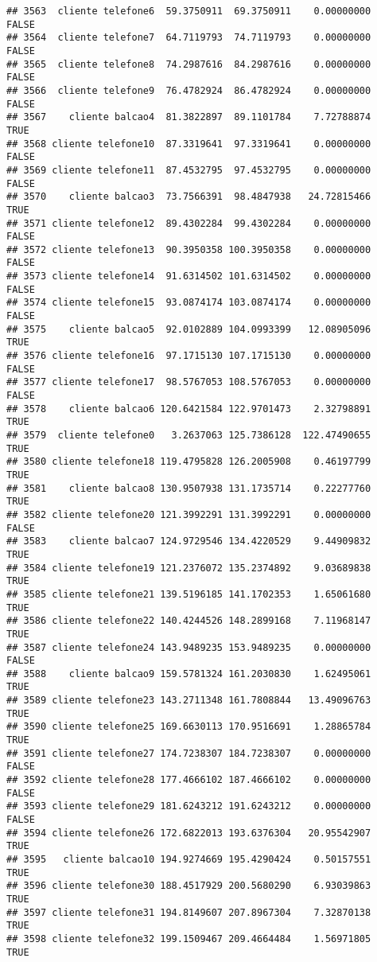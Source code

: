 \documentclass[
]{article}
\begin{document}
\begin{verbatim}
## 3563  cliente telefone6  59.3750911  69.3750911    0.00000000    FALSE
## 3564  cliente telefone7  64.7119793  74.7119793    0.00000000    FALSE
## 3565  cliente telefone8  74.2987616  84.2987616    0.00000000    FALSE
## 3566  cliente telefone9  76.4782924  86.4782924    0.00000000    FALSE
## 3567    cliente balcao4  81.3822897  89.1101784    7.72788874     TRUE
## 3568 cliente telefone10  87.3319641  97.3319641    0.00000000    FALSE
## 3569 cliente telefone11  87.4532795  97.4532795    0.00000000    FALSE
## 3570    cliente balcao3  73.7566391  98.4847938   24.72815466     TRUE
## 3571 cliente telefone12  89.4302284  99.4302284    0.00000000    FALSE
## 3572 cliente telefone13  90.3950358 100.3950358    0.00000000    FALSE
## 3573 cliente telefone14  91.6314502 101.6314502    0.00000000    FALSE
## 3574 cliente telefone15  93.0874174 103.0874174    0.00000000    FALSE
## 3575    cliente balcao5  92.0102889 104.0993399   12.08905096     TRUE
## 3576 cliente telefone16  97.1715130 107.1715130    0.00000000    FALSE
## 3577 cliente telefone17  98.5767053 108.5767053    0.00000000    FALSE
## 3578    cliente balcao6 120.6421584 122.9701473    2.32798891     TRUE
## 3579  cliente telefone0   3.2637063 125.7386128  122.47490655     TRUE
## 3580 cliente telefone18 119.4795828 126.2005908    0.46197799     TRUE
## 3581    cliente balcao8 130.9507938 131.1735714    0.22277760     TRUE
## 3582 cliente telefone20 121.3992291 131.3992291    0.00000000    FALSE
## 3583    cliente balcao7 124.9729546 134.4220529    9.44909832     TRUE
## 3584 cliente telefone19 121.2376072 135.2374892    9.03689838     TRUE
## 3585 cliente telefone21 139.5196185 141.1702353    1.65061680     TRUE
## 3586 cliente telefone22 140.4244526 148.2899168    7.11968147     TRUE
## 3587 cliente telefone24 143.9489235 153.9489235    0.00000000    FALSE
## 3588    cliente balcao9 159.5781324 161.2030830    1.62495061     TRUE
## 3589 cliente telefone23 143.2711348 161.7808844   13.49096763     TRUE
## 3590 cliente telefone25 169.6630113 170.9516691    1.28865784     TRUE
## 3591 cliente telefone27 174.7238307 184.7238307    0.00000000    FALSE
## 3592 cliente telefone28 177.4666102 187.4666102    0.00000000    FALSE
## 3593 cliente telefone29 181.6243212 191.6243212    0.00000000    FALSE
## 3594 cliente telefone26 172.6822013 193.6376304   20.95542907     TRUE
## 3595   cliente balcao10 194.9274669 195.4290424    0.50157551     TRUE
## 3596 cliente telefone30 188.4517929 200.5680290    6.93039863     TRUE
## 3597 cliente telefone31 194.8149607 207.8967304    7.32870138     TRUE
## 3598 cliente telefone32 199.1509467 209.4664484    1.56971805     TRUE

\end{verbatim}
\end{document}
